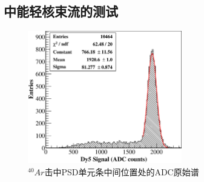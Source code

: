 \subsection{中能轻核束流的测试}
\label{sec:dynamic_range:ion_beam}

\begin{figure}[!htbp]
	\centering
	\includegraphics[width=0.6\textwidth]{chap/dynamic_range/fig/Ar.eps}
	\caption{$^{40}Ar$击中PSD单元条中间位置处的ADC原始谱}
	\label{fig:dynamic_range:Ar}
\end{figure}